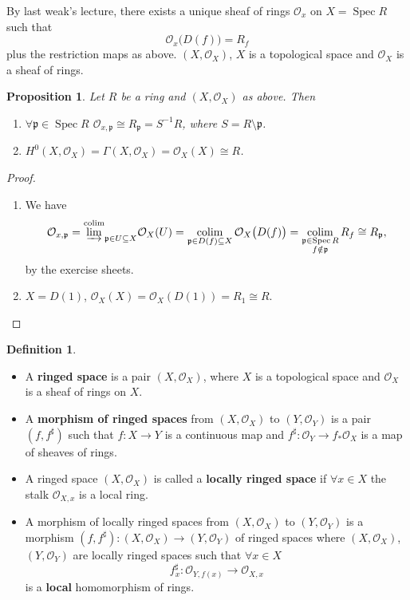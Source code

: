 \documentclass[12pt]{article}
\DeclareMathOperator{\Spec}{Spec}
\DeclareMathOperator*{\colim}{colim}
\newtheorem*{proposition}{Proposition}
\theoremstyle{definition}
\newtheorem*{definition}{Definition}
\begin{document}
By last weak's lecture, there exists a unique sheaf of rings $\mathcal{O}_x$ on $X=\Spec R$ such that
\[\mathcal{O}_x\big(D(f)\big)=R_f\]
plus the restriction maps as above. $(X,\mathcal{O}_X)$, $X$ is a topological space and $\mathcal{O}_X$ is a sheaf of rings.

\begin{proposition}
Let $R$ be a ring and $(X,\mathcal{O}_X)$ as above. Then
\begin{enumerate}[label=\arabic*)]
\item $\forall\mathfrak{p}\in\Spec R$ $\mathcal{O}_{x,\mathfrak{p}}\cong R_{\mathfrak{p}}=S^{-1}R$, where $S=R\setminus\mathfrak{p}$.

\item $H^0(X,\mathcal{O}_X)=\Gamma(X,\mathcal{O}_X)=\mathcal{O}_X(X)\cong R$.
\end{enumerate}
\end{proposition}

\begin{proof}
\begin{enumerate}[label=\arabic*)]
\item We have
\[\mathcal{O}_{x,\mathfrak{p}}=\overset{\colim}{\varinjlim}_{\mathfrak{p}\in U\subseteq X}\mathcal{O}_X(U)=\colim_{\mathfrak{p}\in D(f)\subseteq X}\mathcal{O}_X\big(D(f)\big)=\colim_{\substack{\mathfrak{p}\in\Spec R\\f\notin\mathfrak{p}}}R_f\cong R_{\mathfrak{p}},\]
by the exercise sheets.

\item $X=D(1)$, $\mathcal{O}_X(X)=\mathcal{O}_X(D(1))=R_1\cong R$.
\end{enumerate}
\end{proof}

\begin{definition}
\begin{itemize}
\item A \textbf{ringed space} is a pair $(X,\mathcal{O}_X)$, where $X$ is a topological space and $\mathcal{O}_X$ is a sheaf of rings on $X$.

\item A \textbf{morphism of ringed spaces} from $(X,\mathcal{O}_X)$ to $(Y,\mathcal{O}_Y)$ is a pair $(f,f^{\sharp})$ such that $f:X\rightarrow Y$ is a continuous map and $f^{\sharp}:\mathcal{O}_Y\rightarrow f_*\mathcal{O}_X$ is a map of sheaves of rings.

\item A ringed space $(X,\mathcal{O}_X)$ is called a \textbf{locally ringed space} if $\forall x\in X$ the stalk $\mathcal{O}_{X,x}$ is a local ring.

\item A morphism of locally ringed spaces from $(X,\mathcal{O}_X)$ to $(Y,\mathcal{O}_Y)$ is a morphism $(f,f^{\sharp}):(X,\mathcal{O}_X)\rightarrow(Y,\mathcal{O}_Y)$ of ringed spaces where $(X,\mathcal{O}_X)$, $(Y,\mathcal{O}_Y)$ are locally ringed spaces such that $\forall x\in X$
\[f_x^{\sharp}:\mathcal{O}_{Y,f(x)}\longrightarrow\mathcal{O}_{X,x}\]
is a \textbf{local} homomorphism of rings.
\end{itemize}
\end{definition}
\end{document}
